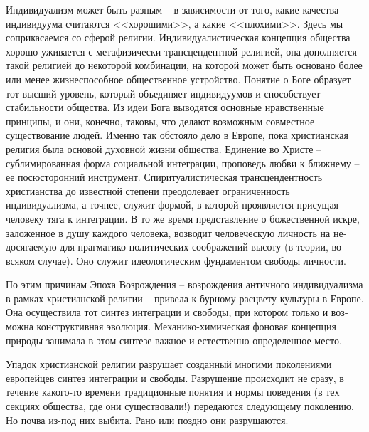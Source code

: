 \documentclass{book}
\begin{document}
Индивидуализм может быть разным -- в зависимости от то­го, какие качества индивидуума считаются <<хорошими>>, а ка­кие <<плохими>>. Здесь мы соприкасаемся со сферой религии. Индивидуалистическая концепция общества хорошо уживает­ся с метафизически трансцендентной религией, она дополняет­ся такой религией до некоторой комбинации, на которой может быть основано более или менее жизнеспособное общественное устройство. Понятие о Боге образует тот высший уровень, ко­торый объединяет индивидуумов и способствует стабильности общества. Из идеи Бога выводятся основные нравственные принципы, и они, конечно, таковы, что делают возможным совместное существование людей. Именно так обстояло дело в Европе, пока христианская религия была основой духовной жизни общества. Единение во Христе -- сублимированная форма социальной интеграции, проповедь любви к ближнему -- ее по­сюсторонний инструмент. Спиритуалистическая трансцендент­ность христианства до известной степени преодолевает ограни­ченность индивидуализма, а точнее, служит 
формой, в которой проявляется присущая человеку тяга к интеграции. В то же время представление о божественной искре, заложенное в ду­шу каждого человека, возводит человеческую личность на не­досягаемую для прагматико-политических соображений высоту (в теории, во всяком случае). Оно служит идеологическим фундаментом свободы личности.

По этим причинам Эпоха Возрождения -- возрождения антич­ного индивидуализма в рамках христианской религии -- при­вела к бурному расцвету культуры в Европе. Она осуществила тот синтез интеграции и свободы, при котором только и воз­можна конструктивная эволюция. Механико-химическая фоно­вая концепция природы занимала в этом синтезе важное и ес­тественно определенное место.

Упадок христианской религии разрушает созданный многи­ми поколениями европейцев синтез интеграции и свободы. Раз­рушение происходит не сразу, в течение какого-то времени традиционные понятия и нормы поведения (в тех секциях об­щества, где они существовали!) передаются следующему поколению. Но почва из-под них выбита. Рано или поздно они разру­шаются.
\end{document}
